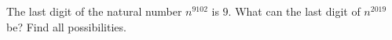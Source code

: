 The last digit of the natural number $n^{9102}$ is $9$. What can the last digit of $n^{2019}$ be? Find all possibilities.

